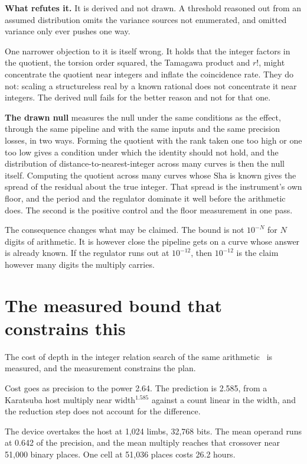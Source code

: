 \textbf{What refutes it.} It is derived and not drawn. A threshold reasoned out from an assumed
distribution omits the variance sources not enumerated, and omitted variance only ever pushes one
way.

One narrower objection to it is itself wrong. It holds that the integer factors in the quotient, the
torsion order squared, the Tamagawa product and $r!$, might concentrate the quotient near integers
and inflate the coincidence rate. They do not: scaling a structureless real by a known rational does
not concentrate it near integers. The derived null fails for the better reason and not for that one.

\textbf{The drawn null} measures the null under the same conditions as the effect, through the same
pipeline and with the same inputs and the same precision losses, in two ways. Forming the quotient
with the rank taken one too high or one too low gives a condition under which the identity should
not hold, and the distribution of distance-to-nearest-integer across many curves is then the null
itself. Computing the quotient across many curves whose $\mathrm{Sha}$ is known gives the spread of
the residual about the true integer. That spread is the instrument's own floor, and the period and
the regulator dominate it well before the arithmetic does. The second is the positive control and
the floor measurement in one pass.

The consequence changes what may be claimed. The bound is not $10^{-N}$ for $N$ digits of
arithmetic. It is however close the pipeline gets on a curve whose answer is already known. If the
regulator runs out at $10^{-12}$, then $10^{-12}$ is the claim however many digits the multiply
carries.

\section{The measured bound that constrains this}

The cost of depth in the integer relation search of the same
arithmetic~\cite{src:Quigg-instruments} is measured, and the measurement constrains the plan.

Cost goes as precision to the power 2.64. The prediction is 2.585, from a Karatsuba host multiply
near width$^{1.585}$ against a count linear in the width, and the reduction step does not account
for the difference.

The device overtakes the host at 1{,}024 limbs, 32{,}768 bits. The mean operand runs at 0.642 of the
precision, and the mean multiply reaches that crossover near 51{,}000 binary places. One cell at
51{,}036 places costs 26.2 hours.

